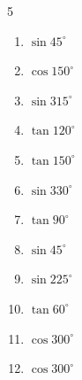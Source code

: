 \begin{multicols}{5}
\begin{enumerate}

  \item $\displaystyle \sin{45^\circ}$


  \item $\displaystyle \cos{150^\circ}$


  \item $\displaystyle \sin{315^\circ}$


  \item $\displaystyle \tan{120^\circ}$


  \item $\displaystyle \tan{150^\circ}$


  \item $\displaystyle \sin{330^\circ}$


  \item $\displaystyle \tan{90^\circ}$

        \phantom{$\displaystyle なし$}

  \item $\displaystyle \sin{45^\circ}$


  \item $\displaystyle \sin{225^\circ}$


\columnbreak %

  \item $\displaystyle \tan{60^\circ}$


  \item $\displaystyle \cos{300^\circ}$


  \item $\displaystyle \cos{300^\circ}$



\end{enumerate}
\end{multicols}
